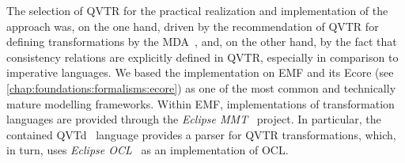 


The selection of \gls{QVTR} for the practical realization and implementation of the approach was, on the one hand, driven by the recommendation of \gls{QVTR} for defining transformations by the \gls{MDA}~\cite{mda}, and, on the other hand, by the fact that consistency relations are explicitly defined in \gls{QVTR}, especially in comparison to imperative languages.
We based the implementation on \gls{EMF} and its Ecore \metametamodel (see \autoref{chap:foundations:formalisms:ecore}) as one of the most common and technically mature modelling frameworks.
Within \gls{EMF}, implementations of transformation languages are provided through the \emph{Eclipse MMT}~\cite{EclipseMMT} project.
In particular, the contained \gls{QVTd}~\cite{EclipseQVTd} language provides a parser for \gls{QVTR} transformations, which, in turn, uses \emph{Eclipse OCL}~\cite{EclipseOCL} as an implementation of \gls{OCL}.

